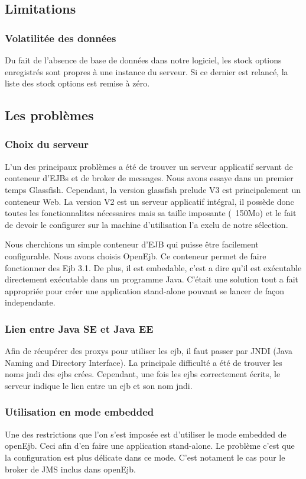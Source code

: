 \subsection{Limitations}
\subsubsection{Volatilitée des données}
Du fait de l'absence de base de données dans notre logiciel, les stock options enregistrés sont propres à une instance du serveur. Si ce dernier est relancé, la liste des stock options est remise à zéro.
\subsection{Les problèmes}
\subsubsection{Choix du serveur}
L'un des principaux problèmes a été de trouver un serveur applicatif servant de conteneur d'EJBs et de broker de messages. Nous avons essaye dans un premier temps Glassfish. Cependant, la version glassfish prelude V3 est principalement un conteneur Web. La version V2 est un serveur applicatif intégral, il possède donc toutes les fonctionnalites nécessaires mais sa taille imposante (~150Mo) et le fait de devoir le configurer sur la machine d'utilisation l'a exclu de notre sélection.

Nous cherchions un simple conteneur d'EJB qui puisse être facilement configurable. Nous avons choisis OpenEjb. Ce conteneur permet de faire fonctionner des Ejb 3.1. De plus, il est embedable, c'est a dire qu'il est exécutable directement exécutable dans un programme Java. C'était une solution tout a fait appropriée pour créer une application stand-alone pouvant se lancer de façon independante.
\subsubsection{Lien entre Java SE et Java EE}
Afin de récupérer des proxys pour utiliser les ejb, il faut passer par JNDI (Java Naming and Directory Interface). La principale difficulté a été de trouver les noms jndi des ejbs crées. Cependant, une fois les ejbs correctement écrits, le serveur indique le lien entre un ejb et son nom jndi.
\subsubsection{Utilisation en mode embedded}
Une des restrictions que l'on s'est imposée est d'utiliser le mode embedded de openEjb. Ceci afin d'en faire une application stand-alone. Le problème c'est que la configuration est plus délicate dans ce mode. C'est notament le cas pour le broker de JMS inclus dans openEjb.
